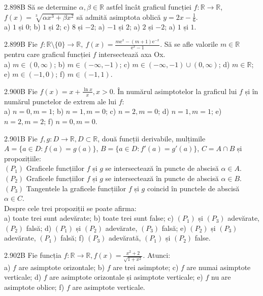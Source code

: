 \documentclass[11pt]{article}
\begin{document}
2.898B Să se determine $\alpha, \beta \in \mathbb{R}$ astfel încât graficul funcției $f: \mathbb{R} \rightarrow \mathbb{R}$, $f(x)=\sqrt[3]{\alpha x^{3}+\beta x^{2}}$ să admită asimptota oblică $y=2 x-\frac{1}{6}$.\\ a) $1$ și $0$; b) $1$ și $2$; c) $8$ și $-2$; a) $-1$ și $2$; a) $2$ și $-2$; a) $1$ și $1$.

2.899B Fie $f: \mathbb{R} \setminus \{0\} \rightarrow \mathbb{R}, \ f(x) = \frac{m \mathrm{e}^{x} - (m + 1) \mathrm{e}^{-x}}{\mathrm{e}^{x} - 1}$. Să se afle valorile $m \in \mathbb{R}$ pentru care graficul funcției $f$ intersectează axa Ox.\\ a) $m \in (0, \infty)$; b) $m \in (-\infty, -1)$; c) $m \in (-\infty, -1) \cup (0, \infty)$; d) $m \in \mathbb{R}$;\\ e) $m \in (-1, 0)$; f) $m \in (-1, 1)$.

2.900B Fie $f(x) = x + \frac{\ln x}{x}, x > 0$. În numărul asimptotelor la graficul lui $f$ și în numărul punctelor de extrem ale lui $f$:\\ a) $n = 0, m = 1$; b) $n = 1, m = 0$; c) $n = 2, m = 0$; d) $n = 1, m = 1$; e) $n = 2, m = 2$; f) $n = 0, m = 0$.

2.901B Fie $f, g: D \rightarrow \mathbb{R}, D \subset \mathbb{R}$, două funcții derivabile, mulțimile $A = \{a \in D : f(a) = g(a)\}$, $B = \{a \in D : f'(a) = g'(a)\}$, $C = A \cap B$ și propozițiile:\\ $(P_1)$ Graficele funcțiilor $f$ și $g$ se intersectează în puncte de abscisă $\alpha \in A$.\\ $(P_2)$ Graficele funcțiilor $f$ și $g$ se intersectează în puncte de abscisă $\alpha \in B$.\\ $(P_3)$ Tangentele la graficele funcțiilor $f$ și $g$ coincid în punctele de abscisă $\alpha \in C$.\\Despre cele trei propoziții se poate afirma:\\ a) toate trei sunt adevărate; b) toate trei sunt false; c) $(P_1)$ și $(P_3)$ adevărate, $(P_2)$ falsă; d) $(P_1)$ și $(P_2)$ adevărate, $(P_3)$ falsă; e) $(P_2)$ și $(P_3)$ adevărate, $(P_1)$ falsă; f) $(P_3)$ adevărată, $(P_1)$ și $(P_2)$ false.

2.902B Fie funcția $f: \mathbb{R} \rightarrow \mathbb{R}, f(x) = \frac{x^2 + 2}{\sqrt{1 + x^2}}$. Atunci:\\ a) $f$ are asimptote orizontale; b) $f$ are trei asimptote; c) $f$ are numai asimptote verticale; d) $f$ are asimptote orizontale și asimptote verticale; e) $f$ nu are asimptote oblice; f) $f$ are asimptote verticale.
\end{document}
